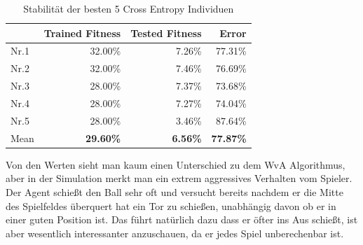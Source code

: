                 \begin{table}[H]
                    \begin{center}
                    \begin{tabular}{ |l|r|r|r| } 
                        \hline
                        \hfill & Trained Fitness   & Tested Fitness  &          Error    \\ \hline
                          Nr.1 &          32.00\%  &          7.26\% &          77.31\%  \\  
                          Nr.2 &          32.00\%  &          7.46\% &          76.69\%  \\  
                          Nr.3 &          28.00\%  &          7.37\% &          73.68\%  \\ 
                          Nr.4 &          28.00\%  &          7.27\% &          74.04\%  \\ 
                          Nr.5 &          28.00\%  &          3.46\% &          87.64\%  \\ \hline
                          Mean &  \textbf{29.60\%} & \textbf{6.56\%} & \textbf{77.87\%}  \\ \hline
                    \end{tabular}
                    \end{center}
                    \caption{Stabilität der besten 5 Cross Entropy Individuen \label{fig:crossentropytable}}
                \end{table}
                \noindent
                Von den Werten sieht man kaum einen Unterschied zu dem WvA Algorithmus, aber in der Simulation merkt man ein extrem aggressives Verhalten vom Spieler. Der Agent schießt den Ball sehr oft und versucht bereits nachdem er die Mitte des Spielfeldes überquert hat ein Tor zu schießen, unabhängig davon ob er in einer guten Position ist. Das führt natürlich dazu dass er öfter ins Aus schießt, ist aber wesentlich interessanter anzuschauen, da er jedes Spiel unberechenbar ist. \\[2mm]

